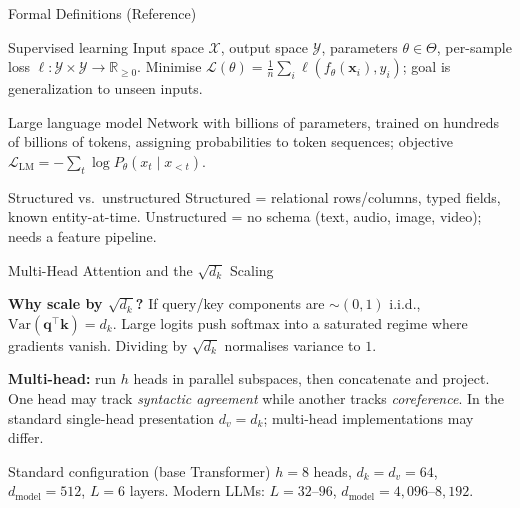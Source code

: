 \documentclass[9pt,t]{beamer}
\begin{document}
\begin{frame}[noframenumbering]{Formal Definitions (Reference)}

\begin{block}{Supervised learning}
Input space $\mathcal{X}$, output space $\mathcal{Y}$, parameters $\theta\in\Theta$,
per-sample loss $\ell:\mathcal{Y}\times\mathcal{Y}\to\mathbb{R}_{\geq0}$. Minimise
$\mathcal{L}(\theta)=\frac1n\sum_i \ell(f_\theta(\mathbf{x}_i),y_i)$; goal is
generalization to unseen inputs.
\end{block}

\begin{block}{Large language model}
Network with billions of parameters, trained on hundreds of billions of tokens,
assigning probabilities to token sequences; objective
$\mathcal{L}_{\mathrm{LM}}=-\sum_t \log P_\theta(x_t\mid x_{<t})$.
\end{block}

\begin{block}{Structured vs.\ unstructured}
Structured = relational rows/columns, typed fields, known entity-at-time.
Unstructured = no schema (text, audio, image, video); needs a feature pipeline.
\end{block}
\end{frame}

\begin{frame}[noframenumbering]{Multi-Head Attention and the $\sqrt{d_k}$ Scaling}

\begin{underhood}
\textbf{Why scale by $\sqrt{d_k}$?} If query/key components are $\sim(0,1)$ i.i.d.,
$\mathrm{Var}(\mathbf{q}^\top\mathbf{k})=d_k$. Large logits push softmax into a
saturated regime where gradients vanish. Dividing by $\sqrt{d_k}$ normalises
variance to $1$.
\end{underhood}

\medskip
\textbf{Multi-head:} run $h$ heads in parallel subspaces, then concatenate and project.
One head may track \emph{syntactic agreement} while another tracks
\emph{coreference}. In the standard single-head presentation $d_v=d_k$; multi-head
implementations may differ.

\medskip
\begin{block}{Standard configuration (base Transformer)}
$h=8$ heads, $d_k=d_v=64$, $d_{\text{model}}=512$, $L=6$ layers.
Modern LLMs: $L=32$--$96$, $d_{\text{model}}=4{,}096$--$8{,}192$.
\end{block}
\end{frame}
\end{document}

